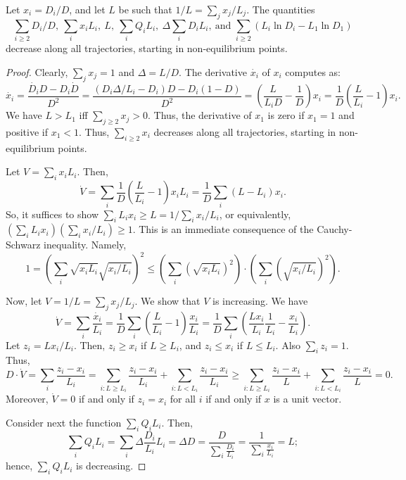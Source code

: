 \documentclass[11pt,a4paper]{article}
\begin{document}
\begin{lemma}\label{lem:parallel links} Let $x_i = D_i/D$, and let $L$ be such
that $1/L = \sum_j x_j/L_j$. The quantities 
\[ \sum_{i \ge 2} D_i/D,\ \sum_i x_i L_i,\ L,\ \sum_i Q_i L_i,\ \Delta \sum_i
D_i L_i,\ \text{and } \sum_{i \ge 2} (L_i \ln D_i - L_1
\ln D_1)\] decrease
along all trajectories, starting in non-equilibrium points. \end{lemma}
\begin{proof}  Clearly, $\sum_j x_j = 1$ and 
$\Delta = L/D$.  The derivative $\dot{x_i}$ of $x_i$ computes as: 
\[ \dot{x_i} = \frac{\dot{D_i}D - D_i \dot{D}}{D^2} 
          = \frac{(D_i\Delta/L_i - D_i)D - D_i(1 - D)}{D^2} 
          = \left(\frac{L}{L_i D} - \frac{1}{D}\right) x_i
          = \frac{1}{D} \left( \frac{L}{L_i} - 1\right) x_i. \]
We have $L > L_1$ iff $\sum_{j \ge 2} x_j > 0$. Thus, the derivative of $x_1$ is
zero if $x_1 = 1$ and positive if $x_1 < 1$. Thus, $\sum_{i \ge 2} x_i$
decreases along all trajectories, starting in non-equilibrium points. \smallskip

Let $V = \sum_i x_i L_i$. Then,
\[ \dot{V} = \sum_i \frac{1}{D}\left(\frac{L}{L_i} - 1\right)x_i L_i = \frac{1}{D}
\sum_i (L - L_i) x_i. \]
So, it suffices to show $\sum_i L_i x_i \ge L = 1/\sum_i x_i/L_i$, or
equivalently,
$(\sum_i L_i x_i) (\sum_i x_i/L_i) \ge 1$. This is an immediate consequence of
the Cauchy-Schwarz inequality. Namely,
\[ 1 = \left(\sum_i \sqrt{x_i L_i} \sqrt{x_i/L_i}\right)^2  \le  \left(\sum_i
(\sqrt{x_i L_i})^2\right)\cdot \left(\sum_i ( \sqrt{x_i/L_i})^2 \right).\]\smallskip

Now, let $V = 1/L = \sum_j x_j/L_j$. We show that $V$ is increasing. We have 
\[ \dot{V} = \sum_i \frac{\dot{x_i}}{L_i} = \frac{1}{D} \sum_i \left(\frac{L}{L_i} -
1 \right)\frac{x_i}{L_i} = 
\frac{1}{D} \sum_i \left(\frac {L x_i}{L_i}\frac{1}{L_i} -
\frac{x_i}{L_i}\right) .\]
Let $z_i = Lx_i/L_i$. Then, $z_i \ge x_i$ if $L \ge L_i$, and $z_i \le x_i$ if $L
\le L_i$. Also $\sum_i z_i = 1$. Thus,
\[ D\cdot \dot{V} = \sum_i \frac{z_i - x_i}{L_i} = 
\sum_{i: L \ge L_i} \frac{z_i - x_i}{L_i} + \sum_{i: L < L_i} \frac{z_i -
x_i}{L_i} \ge \sum_{i: L \ge L_i} \frac{z_i - x_i}{L} + \sum_{i: L < L_i} \frac{z_i -
x_i}{L} = 0.\]
Moreover, $\dot{V} = 0$ if and only if $z_i = x_i$ for all $i$ if and only if
$x$ is a unit vector. \smallskip

Consider next the function $\sum_i Q_i L_i$. Then, 
\[ \sum_i Q_i L_i = \sum_i \Delta \frac{D_i}{L_i} L_i = \Delta D = \frac{D}{\sum_i
\frac{D_i}{L_i}} = \frac{1}{\sum_i \frac{x_i}{L_i}} = L; \]
hence, $\sum_i Q_i L_i$ is decreasing. \smallskip


\end{proof}
\end{document}
